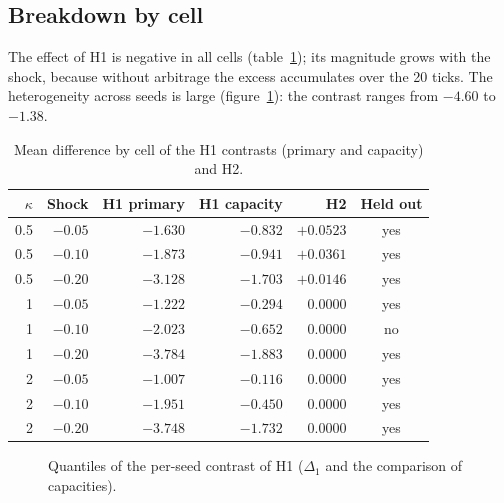 \subsection{Breakdown by cell}

The effect of H1 is negative in all cells (table~\ref{tab:celdas}); its magnitude grows with the shock, because without arbitrage the excess accumulates over the 20 ticks. The heterogeneity across seeds is large (figure~\ref{fig:cuantiles}): the contrast ranges from $-4.60$ to $-1.38$.

\begin{table}[htbp]
\centering
\caption{Mean difference by cell of the H1 contrasts (primary and capacity) and H2.}
\label{tab:celdas}
\small
\begin{tabular}{@{}rrrrrc@{}}
\toprule
$\kappa$ & Shock & H1 primary & H1 capacity & H2 & Held out \\
\midrule
0.5 & $-0.05$ & $-1.630$ & $-0.832$ & $+0.0523$ & yes \\
0.5 & $-0.10$ & $-1.873$ & $-0.941$ & $+0.0361$ & yes \\
0.5 & $-0.20$ & $-3.128$ & $-1.703$ & $+0.0146$ & yes \\
1 & $-0.05$ & $-1.222$ & $-0.294$ & $0.0000$ & yes \\
1 & $-0.10$ & $-2.023$ & $-0.652$ & $0.0000$ & no \\
1 & $-0.20$ & $-3.784$ & $-1.883$ & $0.0000$ & yes \\
2 & $-0.05$ & $-1.007$ & $-0.116$ & $0.0000$ & yes \\
2 & $-0.10$ & $-1.951$ & $-0.450$ & $0.0000$ & yes \\
2 & $-0.20$ & $-3.748$ & $-1.732$ & $0.0000$ & yes \\
\bottomrule
\end{tabular}
\end{table}

\begin{figure}[htbp]
\centering
{}
\caption{Quantiles of the per-seed contrast of H1 ($\Delta_1$ and the comparison of capacities).}
\label{fig:cuantiles}
\end{figure}

